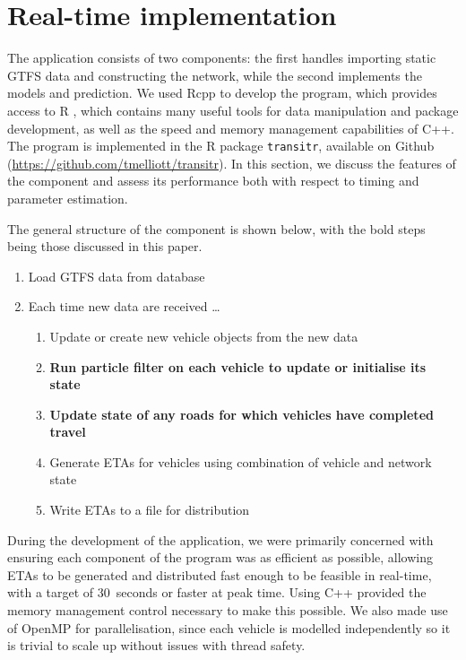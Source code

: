 \section{Real-time implementation}
\label{sec:rt}

The application consists of two components:
the first handles importing static GTFS data and constructing the network,
while the second implements the \rt models and prediction.
We used Rcpp \citep{Rcpp}
to develop the program,
which provides access to R \citep{rcore},
which contains many useful tools for data manipulation and package development,
as well as the speed and memory management capabilities of C++.
The program is implemented in the R package
\verb+transitr+, available on Github (\url{https://github.com/tmelliott/transitr}).
In this section, we discuss the features of the \rt component
and assess its performance 
both with respect to timing and parameter estimation.

The general structure of the \rt component is shown below,
with the bold steps being those discussed in this paper.
\begin{enumerate}
\item Load GTFS data from database
\item Each time new data are received \ldots
\begin{enumerate}
    \item Update or create new vehicle objects from the new data
    \item \textbf{Run particle filter on each vehicle to update or initialise its state}
    \item \textbf{Update state of any roads for which vehicles 
        have completed travel}
    \item Generate ETAs for vehicles using combination of vehicle and network state
    \item Write ETAs to a file for distribution
\end{enumerate}
\end{enumerate}


During the development of the application,
we were primarily concerned with ensuring each component of the program
was as efficient as possible,
allowing ETAs to be generated and distributed fast enough to be feasible in real-time,
with a target of 30~seconds or faster at peak time.
Using C++ provided the memory management control necessary to make this possible.
We also made use of OpenMP for parallelisation,
since each vehicle is modelled independently so it is trivial to scale up without
issues with thread safety.


